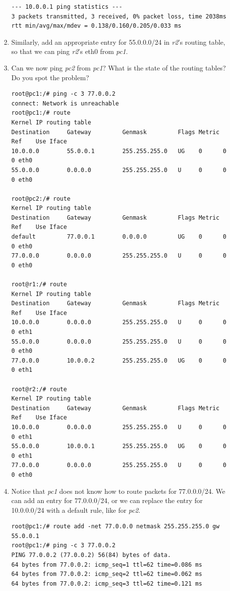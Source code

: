 \documentclass[12pt]{book}
\begin{document}
\begin{enumerate}[label=\arabic*.]
\begin{enumerate}[resume*]
\begin{lstlisting}
--- 10.0.0.1 ping statistics ---
3 packets transmitted, 3 received, 0% packet loss, time 2038ms
rtt min/avg/max/mdev = 0.138/0.160/0.205/0.033 ms
  \end{lstlisting}

\item Similarly, add an appropriate entry for 55.0.0.0/24 in \emph{r2}'s routing table, so that we can ping \emph{r2}'s eth0 from \emph{pc1}. 

\item Can we now ping \emph{pc2} from \emph{pc1}? What is the state of the routing tables? Do you spot the problem?
  \begin{lstlisting}
root@pc1:/# ping -c 3 77.0.0.2
connect: Network is unreachable
root@pc1:/# route
Kernel IP routing table
Destination     Gateway         Genmask         Flags Metric Ref    Use Iface
10.0.0.0        55.0.0.1        255.255.255.0   UG    0      0        0 eth0
55.0.0.0        0.0.0.0         255.255.255.0   U     0      0        0 eth0

root@pc2:/# route
Kernel IP routing table
Destination     Gateway         Genmask         Flags Metric Ref    Use Iface
default         77.0.0.1        0.0.0.0         UG    0      0        0 eth0
77.0.0.0        0.0.0.0         255.255.255.0   U     0      0        0 eth0

root@r1:/# route
Kernel IP routing table
Destination     Gateway         Genmask         Flags Metric Ref    Use Iface
10.0.0.0        0.0.0.0         255.255.255.0   U     0      0        0 eth1
55.0.0.0        0.0.0.0         255.255.255.0   U     0      0        0 eth0
77.0.0.0        10.0.0.2        255.255.255.0   UG    0      0        0 eth1

root@r2:/# route
Kernel IP routing table
Destination     Gateway         Genmask         Flags Metric Ref    Use Iface
10.0.0.0        0.0.0.0         255.255.255.0   U     0      0        0 eth1
55.0.0.0        10.0.0.1        255.255.255.0   UG    0      0        0 eth1
77.0.0.0        0.0.0.0         255.255.255.0   U     0      0        0 eth0
  \end{lstlisting}

\item Notice that \emph{pc1} does not know how to route packets for 77.0.0.0/24. We can add an entry for 77.0.0.0/24, or we can replace the entry for 10.0.0.0/24 with a default rule, like for \emph{pc2}.
  \begin{lstlisting}
root@pc1:/# route add -net 77.0.0.0 netmask 255.255.255.0 gw 55.0.0.1
root@pc1:/# ping -c 3 77.0.0.2
PING 77.0.0.2 (77.0.0.2) 56(84) bytes of data.
64 bytes from 77.0.0.2: icmp_seq=1 ttl=62 time=0.086 ms
64 bytes from 77.0.0.2: icmp_seq=2 ttl=62 time=0.062 ms
64 bytes from 77.0.0.2: icmp_seq=3 ttl=62 time=0.121 ms


\end{lstlisting}
\end{enumerate}
\end{enumerate}
\end{document}
